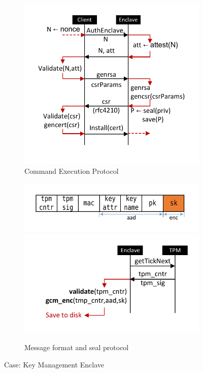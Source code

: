 \documentclass[10pt]{article}
\begin{document}
  \begin{figure}[h]
  \centering
  \begin{subfigure}[b]{.5\textwidth}
    \centering
    \includegraphics[width=.8\linewidth]{Diagrams/SeqCompProblem}
    \caption{Command Execution Protocol}
    \label{fig:sequentialcomp}
  \end{subfigure}%
  \begin{subfigure}[b]{.5\textwidth}
    \centering
    \includegraphics[width=.9\linewidth]{Diagrams/MsgFmt}\\\vfill
    \includegraphics[width=.9\linewidth]{Diagrams/SealProtocol}
    \caption{Message format and seal protocol}
    \label{fig:sealprotocol}
  \end{subfigure}
  \caption{Case: Key Management Enclave}
  \label{fig:usecase}
  \end{figure}  
\end{document}
